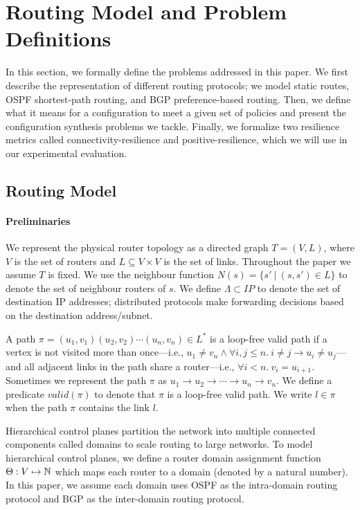 \section{Routing Model and Problem Definitions}
In this section, we formally define the problems addressed in this
paper.  We first describe the representation of different
routing protocols; we model static
routes, OSPF shortest-path routing, and BGP preference-based routing.
Then, we define what it means for a configuration to meet a given
set of policies and present the configuration synthesis problems
we tackle.
Finally, we formalize two resilience metrics called 
connectivity-resilience and positive-resilience,
which we will use in our experimental evaluation.


\subsection{Routing Model}

\paragraph{Preliminaries}
We represent the physical router topology as a directed graph $T=(V, L)$,
where $V$ is the set of routers and $L\subseteq V\times V$ is the set of links. 
Throughout the paper we assume $T$ is fixed.
We use the neighbour function $N(s) = \{s'\ | \ (s,s') \in L \}$ to denote 
the set of neighbour routers of $s$. 
We define $\Lambda \subset IP$ to denote the set of 
destination IP addresses;
distributed protocols make forwarding decisions based on the 
destination address/subnet.

A path $\pi = (u_1,v_1) (u_2, v_2) \cdots (u_n, v_n) \in L^*$ is a 
loop-free valid path if
a  vertex is not visited more than once---i.e.,
$u_1\neq v_n\wedge\forall i,j \leq n. 
~i \not= j \rightarrow u_i \not= u_j$---and all adjacent links in the
path share a router---i.e., $\forall i < n. ~v_i = u_{i+1}$.
Sometimes we represent the path $\pi$ as $u_1\rightarrow u_2 \rightarrow  \cdots \rightarrow u_n \rightarrow v_n$.
We define a predicate $valid(\pi)$ to denote that $\pi$
is a loop-free valid path. 
We write $l \in \pi$ when the path $\pi$ contains the link $l$. 

Hierarchical control planes partition the
network into multiple connected components called domains 
to scale routing to large networks. To model hierarchical 
control planes, 
we define a router domain assignment function
$\Theta: V \mapsto \mathbb{N}$ which maps each router to a domain 
(denoted by a natural number). In this paper, we assume 
each domain uses OSPF as the intra-domain routing protocol
and BGP as the inter-domain routing protocol. 

